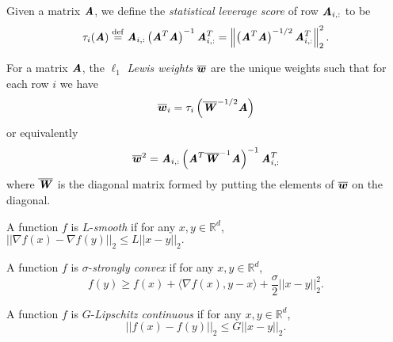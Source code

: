 \begin{definition}\label{def:levScore}
	Given a matrix $\AA$, we define the \textit{statistical leverage score} of row $\AA_{i,:}$ to be 
	\[\tau_i(\AA) \defeq \AA_{i,:}\left(\AA^T \AA\right)^{-1}\AA_{i,:}^T = \norme{\left(\AA^T\AA\right)^{-1/2}\AA_{i,:}^T}^2. \]
\end{definition}


\begin{definition}\label{def:lewis}
	For a matrix $\AA$, the $\ell_1$ \textit{Lewis weights} $\lw$ are the unique weights such that for each row $i$ we have 
	\[\lw_i = \tau_i\left(\LW^{-1/2}\AA\right) 
	\]
	or equivalently
	\[\lw^2 = \AA_{i,:}\left(\AA^T\LW^{-1}\AA\right)^{-1}\AA_{i,:}^T\]
	where $\LW$ is the diagonal matrix formed by putting the elements of $\lw$ on the diagonal.
\end{definition}


\begin{definition}\label{def:smooth}
	A function $f$ is $L$-\textit{smooth} if for any $x,y \in \mathbb{R}^d$, $||\nabla f(x) - \nabla f(y)||_2 \leq L||x-y||_2.$
\end{definition}

\begin{definition}\label{def:strong_convex}
	A function $f$ is $\sigma$-\textit{strongly convex} if for any $x,y \in \mathbb{R}^d$,
	\begin{equation*}
	\textstyle{f(y) \geq f(x) + \langle \nabla f(x),y-x\rangle + \frac{\sigma}{2}||x-y||_2^2}.
	\end{equation*}
\end{definition}

\begin{definition}\label{def:lipsCont}
	A function $f$ is $G$-\textit{Lipschitz continuous} if for any $x,y \in \mathbb{R}^d$, 	
	\[ ||f(x) - f(y)||_2 \leq G||x-y||_2.\] 	
\end{definition}

